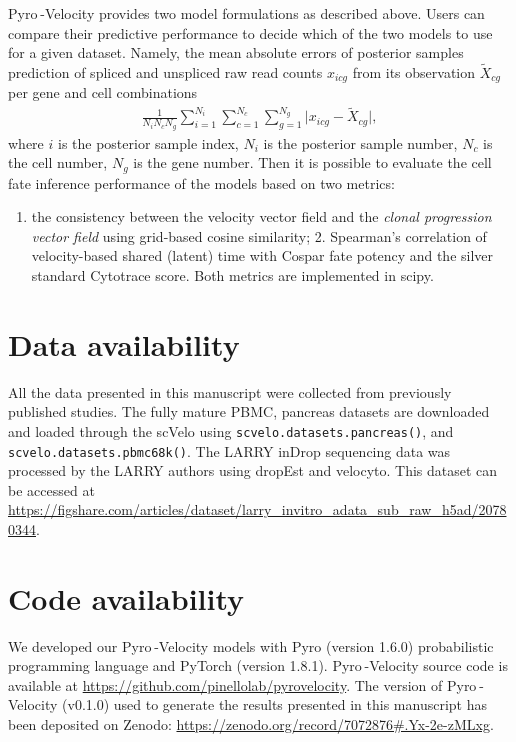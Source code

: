 \documentclass[
  sn-mathphys-num,
  lineno,
  twocolumn]{sn-jnl}
\providecommand{\tightlist}{%
  \setlength{\itemsep}{0pt}\setlength{\parskip}{0pt}}\usepackage{longtable,booktabs,array}
\begin{document}
Pyro -Velocity provides two model formulations as described above. Users
can compare their predictive performance to decide which of the two
models to use for a given dataset. Namely, the mean absolute errors of
posterior samples prediction of spliced and unspliced raw read counts
\(x_{icg}\) from its observation \(\tilde{X}_{cg}\) per gene and cell
combinations \begin{align*}
\frac{1}{N_i N_c N_g} \sum_{i=1}^{N_i} \sum_{c=1}^{N_c} \sum_{g=1}^{N_g} 
  \vert x_{icg} - \tilde{X}_{cg} \vert,
\end{align*} where \(i\) is the posterior sample index, \(N_i\) is the
posterior sample number, \(N_c\) is the cell number, \(N_g\) is the gene
number. Then it is possible to evaluate the cell fate inference
performance of the models based on two metrics:

\begin{enumerate}
\def\labelenumi{\arabic{enumi}.}
\tightlist
\item
  the consistency between the velocity vector field and the \emph{clonal
  progression vector field} using grid-based cosine similarity; 2.
  Spearman's correlation of velocity-based shared (latent) time with
  Cospar fate potency and the silver standard Cytotrace score. Both
  metrics are implemented in scipy.
\end{enumerate}

\section{Data availability}\label{data-availability}

All the data presented in this manuscript were collected from previously
published studies. The fully mature PBMC, pancreas datasets are
downloaded and loaded through the scVelo using
\texttt{scvelo.datasets.pancreas()}, and
\texttt{scvelo.datasets.pbmc68k()}. The LARRY inDrop sequencing data was
processed by the LARRY authors using dropEst \citep{Petukhov2018-nr} and
velocyto. This dataset can be accessed at
\url{https://figshare.com/articles/dataset/larry_invitro_adata_sub_raw_h5ad/20780344}.

\section{Code availability}\label{code-availability}

We developed our Pyro -Velocity models with Pyro (version 1.6.0)
probabilistic programming language and PyTorch (version 1.8.1).
Pyro -Velocity source code is available at
\url{https://github.com/pinellolab/pyrovelocity}. The version of
Pyro -Velocity (v0.1.0) used to generate the results presented in this
manuscript has been deposited on Zenodo:
\url{https://zenodo.org/record/7072876\#.Yx-2e-zMLxg}.
\end{document}
